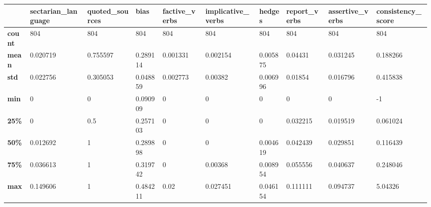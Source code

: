 \begin{tabular}{|l|l|l|l|l|l|l|l|l|l|}
\hline
               & \textbf{sectarian\_language} & \textbf{quoted\_sources} & \textbf{bias} & \textbf{factive\_verbs} & \textbf{implicative\_verbs} & \textbf{hedges} & \textbf{report\_verbs} & \textbf{assertive\_verbs} & \textbf{consistency\_score} \\ \hline
\textbf{count} & 804                          & 804                      & 804           & 804                     & 804                         & 804             & 804                    & 804                       & 804                         \\ \hline
\textbf{mean}  & 0.020719                     & 0.755597                 & 0.289114      & 0.001331                & 0.002154                    & 0.005875        & 0.04431                & 0.031245                  & 0.188266                    \\ \hline
\textbf{std}   & 0.022756                     & 0.305053                 & 0.048859      & 0.002773                & 0.00382                     & 0.006996        & 0.01854                & 0.016796                  & 0.415838                    \\ \hline
\textbf{min}   & 0                            & 0                        & 0.090909      & 0                       & 0                           & 0               & 0                      & 0                         & -1                          \\ \hline
\textbf{25\%}  & 0                            & 0.5                      & 0.257103      & 0                       & 0                           & 0               & 0.032215               & 0.019519                  & 0.061024                    \\ \hline
\textbf{50\%}  & 0.012692                     & 1                        & 0.289898      & 0                       & 0                           & 0.004619        & 0.042439               & 0.029851                  & 0.116439                    \\ \hline
\textbf{75\%}  & 0.036613                     & 1                        & 0.319742      & 0                       & 0.00368                     & 0.008954        & 0.055556               & 0.040637                  & 0.248046                    \\ \hline
\textbf{max}   & 0.149606                     & 1                        & 0.484211      & 0.02                    & 0.027451                    & 0.046154        & 0.111111               & 0.094737                  & 5.04326                     \\ \hline
\end{tabular}